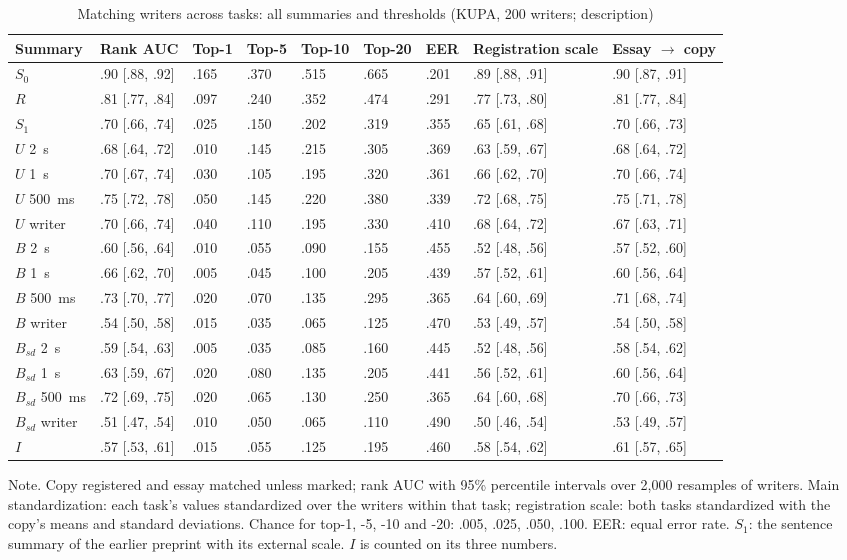 \begin{table}[htbp]
\caption{Matching writers across tasks: all summaries and thresholds (KUPA, 200 writers; description)}
\label{tab:idfull}
\scriptsize
\begin{tabularx}{\linewidth}{@{}lXllllXXX@{}}
\toprule
Summary & Rank AUC & Top-1 & Top-5 & Top-10 & Top-20 & EER & Registration scale & Essay $\to$ copy \\
\midrule
$S_0$ & .90 [.88, .92] & .165 & .370 & .515 & .665 & .201 & .89 [.88, .91] & .90 [.87, .91] \\
$R$ & .81 [.77, .84] & .097 & .240 & .352 & .474 & .291 & .77 [.73, .80] & .81 [.77, .84] \\
$S_1$ & .70 [.66, .74] & .025 & .150 & .202 & .319 & .355 & .65 [.61, .68] & .70 [.66, .73] \\
$U$ 2~s & .68 [.64, .72] & .010 & .145 & .215 & .305 & .369 & .63 [.59, .67] & .68 [.64, .72] \\
$U$ 1~s & .70 [.67, .74] & .030 & .105 & .195 & .320 & .361 & .66 [.62, .70] & .70 [.66, .74] \\
$U$ 500~ms & .75 [.72, .78] & .050 & .145 & .220 & .380 & .339 & .72 [.68, .75] & .75 [.71, .78] \\
$U$ writer & .70 [.66, .74] & .040 & .110 & .195 & .330 & .410 & .68 [.64, .72] & .67 [.63, .71] \\
$B$ 2~s & .60 [.56, .64] & .010 & .055 & .090 & .155 & .455 & .52 [.48, .56] & .57 [.52, .60] \\
$B$ 1~s & .66 [.62, .70] & .005 & .045 & .100 & .205 & .439 & .57 [.52, .61] & .60 [.56, .64] \\
$B$ 500~ms & .73 [.70, .77] & .020 & .070 & .135 & .295 & .365 & .64 [.60, .69] & .71 [.68, .74] \\
$B$ writer & .54 [.50, .58] & .015 & .035 & .065 & .125 & .470 & .53 [.49, .57] & .54 [.50, .58] \\
$B_{sd}$ 2~s & .59 [.54, .63] & .005 & .035 & .085 & .160 & .445 & .52 [.48, .56] & .58 [.54, .62] \\
$B_{sd}$ 1~s & .63 [.59, .67] & .020 & .080 & .135 & .205 & .441 & .56 [.52, .61] & .60 [.56, .64] \\
$B_{sd}$ 500~ms & .72 [.69, .75] & .020 & .065 & .130 & .250 & .365 & .64 [.60, .68] & .70 [.66, .73] \\
$B_{sd}$ writer & .51 [.47, .54] & .010 & .050 & .065 & .110 & .490 & .50 [.46, .54] & .53 [.49, .57] \\
$I$ & .57 [.53, .61] & .015 & .055 & .125 & .195 & .460 & .58 [.54, .62] & .61 [.57, .65] \\
\bottomrule
\end{tabularx}
\par\smallskip\footnotesize Note. Copy registered and essay matched unless marked; rank AUC with 95\% percentile intervals over 2,000 resamples of writers. Main standardization: each task's values standardized over the writers within that task; registration scale: both tasks standardized with the copy's means and standard deviations. Chance for top-1, -5, -10 and -20: .005, .025, .050, .100. EER: equal error rate. $S_1$: the sentence summary of the earlier preprint with its external scale. $I$ is counted on its three numbers.
\end{table}
